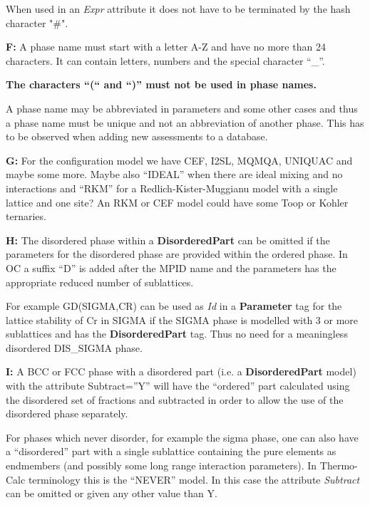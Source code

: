 \documentclass{article}
\begin{document}
\begin{description}
  When used in an {\em Expr} attribute it does not have to be
  terminated by the hash character "\#".

  \newpage
  
\item{\bf F:} A phase name must start with a letter A-Z and have no
  more than 24 characters.  It can contain letters, numbers and the
  special character ``\_''.

  {\bf The characters ``(`` and ``)'' must not be used in phase
    names.}

  A phase name may be abbreviated in parameters and some other cases
  and thus a phase name must be unique and not an abbreviation of
  another phase.  This has to be observed when adding new assessments
  to a database.

\item{\bf G:} For the configuration model we have CEF, I2SL, MQMQA,
  UNIQUAC and maybe some more.  Maybe also ``IDEAL'' when there are
  ideal mixing and no interactions and ``RKM'' for a
  Redlich-Kister-Muggianu model with a single lattice and one site?
  An RKM or CEF model could have some Toop or Kohler ternaries.

\item{\bf H:} The disordered phase within a {\bf DisorderedPart} can
  be omitted if the parameters for the disordered phase are provided
  within the ordered phase.  In OC a suffix ``D'' is added after the
  MPID name and the parameters has the appropriate reduced number of
  sublattices.
  
  For example GD(SIGMA,CR) can be used as {\em Id} in a {\bf
    Parameter} tag for the lattice stability of Cr in SIGMA if the
  SIGMA phase is modelled with 3 or more sublattices and has the {\bf
    DisorderedPart} tag.  Thus no need for a meaningless disordered
  DIS\_SIGMA phase.

\item{\bf I:}  A BCC or FCC phase with a disordered part (i.e.  a {\bf
    DisorderedPart} model) with the attribute Subtract=''Y'' will have
  the ``ordered'' part calculated using the disordered set of
  fractions and subtracted in order to allow the use of the disordered
  phase separately.

  For phases which never disorder, for example the sigma phase, one
  can also have a ``disordered'' part with a single sublattice
  containing the pure elements as endmembers (and possibly some long
  range interaction parameters).  In Thermo-Calc terminology this is
  the ``NEVER'' model.  In this case the attribute {\em Subtract} can
  be omitted or given any other value than Y.


\end{description}
\end{document}
